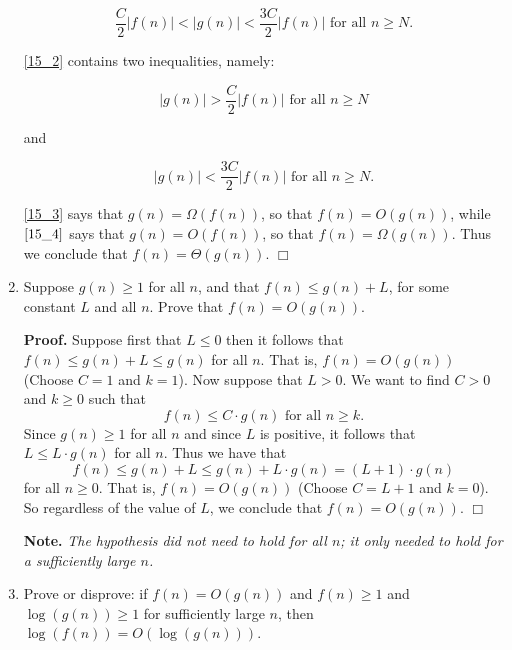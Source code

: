 \documentclass[9pt]{article}
\newcommand{\qed}{\hfill \ensuremath{\Box}}
\begin{document}
\begin{enumerate}
      \begin{equation} \label{15_2}
         \frac{C}{2} |f(n)| < |g(n)| < \frac{3C}{2}|f(n)|
            \text{ for all } n \ge N.
      \end{equation}

      \eqref{15_2} contains two inequalities, namely:

      \begin{equation} \label{15_3}
         |g(n)| > \frac{C}{2} |f(n)| \text{ for all } n \ge N
      \end{equation}

      and

      \begin{equation} \label{15_4}
         |g(n)| < \frac{3C}{2}|f(n)| \text{ for all } n \ge N.
      \end{equation}

      \eqref{15_3} says that $g(n) = \Omega(f(n))$, so that $f(n) = O(g(n))$,
      while $\eqref{15_4}$ says that $g(n) = O(f(n))$, so that
      $f(n) = \Omega(g(n))$. Thus we conclude that $f(n) = \Theta(g(n))$. \qed
   \item Suppose $g(n) \ge 1$ for all $n$, and that $f(n) \le g(n) + L$, for
         some constant $L$ and all $n$. Prove that $f(n) = O(g(n))$.

      \textbf{Proof.} Suppose first that $L \le 0$ then it follows that
      $f(n) \le g(n) + L \le g(n)$ for all $n$. That is, $f(n) = O(g(n))$
      (Choose $C = 1$ and $k = 1$). Now suppose that $L > 0$. We want to find
      $C > 0$ and $k \ge 0$ such that
      $$f(n) \le C \cdot g(n) \text{ for all } n \ge k.$$
      Since $g(n) \ge 1$ for all $n$ and since $L$ is positive, it follows
      that $L \le L \cdot g(n)$ for all $n$. Thus we have that
      $$f(n) \le g(n) + L \le g(n) + L \cdot g(n) = (L+1) \cdot g(n)$$
      for all $n \ge 0$. That is, $f(n) = O(g(n))$ (Choose $C = L + 1$ and
      $k = 0$). So regardless of the value of $L$, we conclude that
      $f(n) = O(g(n))$. \qed

      \textbf{Note.} \textit{The hypothesis did not need to hold for all $n$; it 
      only needed to hold for a sufficiently large $n$.}
   \item Prove or disprove: if $f(n) = O(g(n))$ and $f(n) \ge 1$ and
         $\log(g(n)) \ge 1$ for sufficiently large $n$, then
         $\log(f(n)) = O(\log(g(n)))$.


\end{enumerate}
\end{document}
